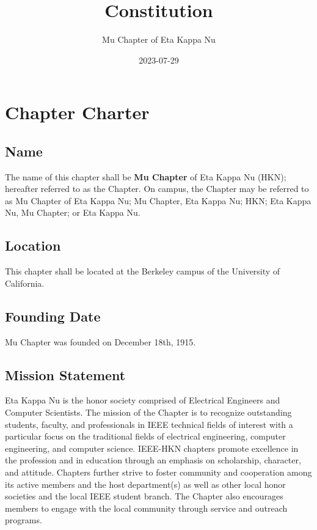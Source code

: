 \documentclass[11pt]{article}
\author{Mu Chapter of Eta Kappa Nu}
\date{2023-07-29}
\title{Constitution}
\begin{document}
\maketitle
\tableofcontents


\section{Chapter Charter}
\label{sec:org6c86196}

\subsection{Name}
\label{sec:orgca336af}

The name of this chapter shall be \textbf{\textbf{Mu Chapter}} of Eta Kappa Nu (HKN); hereafter referred to as the Chapter.
On campus, the Chapter may be referred to as Mu Chapter of Eta Kappa Nu; Mu Chapter, Eta Kappa Nu; HKN; Eta Kappa Nu, Mu Chapter; or Eta Kappa Nu.

\subsection{Location}
\label{sec:orgdb6ed2b}

This chapter shall be located at the Berkeley campus of the University of California.

\subsection{Founding Date}
\label{sec:org3d02517}

Mu Chapter was founded on December 18th, 1915.

\subsection{Mission Statement}
\label{sec:orgce28a3d}

Eta Kappa Nu is the honor society comprised of Electrical Engineers and Computer Scientists.
The mission of the Chapter is to recognize outstanding students, faculty, and professionals in IEEE technical fields of interest with a particular focus on the traditional fields of electrical engineering, computer engineering, and computer science.
IEEE-HKN chapters promote excellence in the profession and in education through an emphasis on scholarship, character, and attitude.
Chapters further strive to foster community and cooperation among its active members and the host department(s) as well as other local honor societies and the local IEEE student branch.
The Chapter also encourages members to engage with the local community through service and outreach programs.
\end{document}
